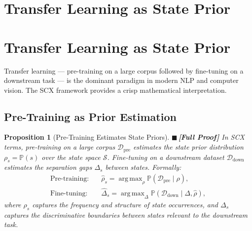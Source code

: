 \documentclass[12pt,a4paper]{article}
\newtheorem{proposition}[theorem]{Proposition}
\theoremstyle{definition}
\newcommand{\rigorFull}{{\color{rigorcolor}$\blacksquare$\,\textbf{[Full Proof]}}}
\newcommand{\SCX}{\textsc{SCX}}
\DeclareMathOperator*{\argmax}{arg\,max}
\newcommand{\Pbb}{\mathbb{P}}
\newcommand{\cD}{\mathcal{D}}
\newcommand{\cS}{\mathcal{S}}
\begin{document}
\section{Transfer Learning as State Prior}
\section{Transfer Learning as State Prior}
\label{sec:transfer}

Transfer learning — pre-training on a large corpus followed by fine-tuning on a downstream task — is the dominant paradigm in modern NLP and computer vision. The \SCX{} framework provides a crisp mathematical interpretation.

\subsection{Pre-Training as Prior Estimation}

\begin{proposition}[Pre-Training Estimates State Priors]\label{prop:pretrain_prior}
\rigorFull
In \SCX{} terms, pre-training on a large corpus $\cD_{\text{pre}}$ estimates the state prior distribution $\rho_s = \Pbb(s)$ over the state space $\cS$. Fine-tuning on a downstream dataset $\cD_{\text{down}}$ estimates the separation gaps $\Delta_s$ between states. Formally:
\begin{align}
    \text{Pre-training:}\quad &\hat{\rho}_s = \argmax_{\rho} \Pbb(\cD_{\text{pre}} \mid \rho), \label{eq:pretrain} \\
    \text{Fine-tuning:}\quad &\hat{\Delta}_s = \argmax_{\Delta} \Pbb(\cD_{\text{down}} \mid \Delta, \hat{\rho}), \label{eq:finetune}
\end{align}
where $\rho_s$ captures the frequency and structure of state occurrences, and $\Delta_s$ captures the discriminative boundaries between states relevant to the downstream task.
\end{proposition}
\end{document}
